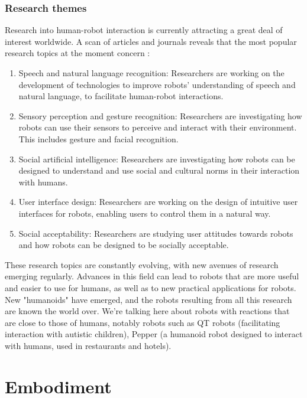 \subsubsection{Research themes}
 Research into human-robot interaction is currently attracting a great deal of interest worldwide. A scan of articles and journals reveals that the most popular research topics at the moment concern :\\
 \begin{enumerate}
    \item Speech and natural language recognition: Researchers are working on the development of technologies to improve robots' understanding of speech and natural language, to facilitate human-robot interactions.
    \item Sensory perception and gesture recognition: Researchers are investigating how robots can use their sensors to perceive and interact with their environment. This includes gesture and facial recognition.
    \item Social artificial intelligence: Researchers are investigating how robots can be designed to understand and use social and cultural norms in their interaction with humans.
    \item User interface design: Researchers are working on the design of intuitive user interfaces for robots, enabling users to control them in a natural way.
    \item Social acceptability: Researchers are studying user attitudes towards robots and how robots can be designed to be socially acceptable.
 \end{enumerate}
 \newpage
 These research topics are constantly evolving, with new avenues of research emerging regularly. Advances in this field can lead to robots that are more useful and easier to use for humans, as well as to new practical applications for robots.\\
New "humanoids" have emerged, and the robots resulting from all this research are known the world over. We're talking here about robots with reactions that are close to those of humans, notably robots such as QT robots (facilitating interaction with autistic children), Pepper (a humanoid robot designed to interact with humans, used in restaurants and hotels).\\

 

\section{Embodiment}

